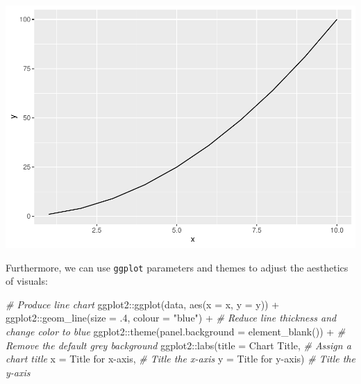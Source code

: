 \documentclass[
]{book}
\newenvironment{Shaded}{\begin{snugshade}}{\end{snugshade}}
\newcommand{\AttributeTok}[1]{\textcolor[rgb]{0.77,0.63,0.00}{#1}}
\newcommand{\CommentTok}[1]{\textcolor[rgb]{0.56,0.35,0.01}{\textit{#1}}}
\newcommand{\DecValTok}[1]{\textcolor[rgb]{0.00,0.00,0.81}{#1}}
\newcommand{\FunctionTok}[1]{\textcolor[rgb]{0.00,0.00,0.00}{#1}}
\newcommand{\NormalTok}[1]{#1}
\newcommand{\SpecialCharTok}[1]{\textcolor[rgb]{0.00,0.00,0.00}{#1}}
\newcommand{\StringTok}[1]{\textcolor[rgb]{0.31,0.60,0.02}{#1}}
\begin{document}
\includegraphics{The_Fundamentals_of_People_Analytics_files/figure-latex/unnamed-chunk-53-1.pdf}

Furthermore, we can use \texttt{ggplot} parameters and themes to adjust the aesthetics of visuals:

\begin{Shaded}
\begin{Highlighting}[]
\CommentTok{\# Produce line chart}
\NormalTok{ggplot2}\SpecialCharTok{::}\FunctionTok{ggplot}\NormalTok{(data, }\FunctionTok{aes}\NormalTok{(}\AttributeTok{x =}\NormalTok{ x, }\AttributeTok{y =}\NormalTok{ y)) }\SpecialCharTok{+}
\NormalTok{ggplot2}\SpecialCharTok{::}\FunctionTok{geom\_line}\NormalTok{(}\AttributeTok{size =}\NormalTok{ .}\DecValTok{4}\NormalTok{, }\AttributeTok{colour =} \StringTok{"blue"}\NormalTok{) }\SpecialCharTok{+} \CommentTok{\# Reduce line thickness and change color to blue}
\NormalTok{ggplot2}\SpecialCharTok{::}\FunctionTok{theme}\NormalTok{(}\AttributeTok{panel.background =} \FunctionTok{element\_blank}\NormalTok{()) }\SpecialCharTok{+} \CommentTok{\# Remove the default grey background}
\NormalTok{ggplot2}\SpecialCharTok{::}\FunctionTok{labs}\NormalTok{(}\AttributeTok{title =} \StringTok{\textquotesingle{}Chart Title\textquotesingle{}}\NormalTok{, }\CommentTok{\# Assign a chart title}
              \AttributeTok{x =} \StringTok{\textquotesingle{}Title for x{-}axis\textquotesingle{}}\NormalTok{, }\CommentTok{\# Title the x{-}axis}
              \AttributeTok{y =} \StringTok{\textquotesingle{}Title for y{-}axis\textquotesingle{}}\NormalTok{) }\CommentTok{\# Title the y{-}axis}
\end{Highlighting}
\end{Shaded}
\end{document}
